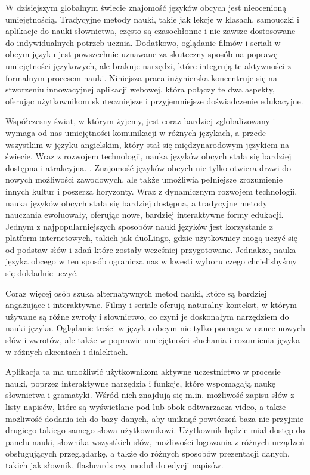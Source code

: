 W dzisiejszym globalnym świecie znajomość języków obcych jest nieocenioną umiejętnością. Tradycyjne metody nauki, takie jak lekcje w klasach, samouczki i aplikacje do nauki słownictwa, często są czasochłonne i nie zawsze dostosowane do indywidualnych potrzeb ucznia. Dodatkowo, oglądanie filmów i seriali w obcym języku jest powszechnie uznawane za skuteczny sposób na poprawę umiejętności językowych, ale brakuje narzędzi, które integrują te aktywności z formalnym procesem nauki. Niniejsza praca inżynierska koncentruje się na stworzeniu innowacyjnej aplikacji webowej, która połączy te dwa aspekty, oferując użytkownikom skuteczniejsze i przyjemniejsze doświadczenie edukacyjne.  

Współczesny świat, w którym żyjemy, jest coraz bardziej zglobalizowany i wymaga od nas umiejętności komunikacji w różnych językach, a przede wszystkim w języku angielskim, który stał się międzynarodowym językiem na świecie. Wraz z rozwojem technologii, nauka języków obcych stała się bardziej dostępna i atrakcyjna. . Znajomość języków obcych nie tylko otwiera drzwi do nowych możliwości zawodowych, ale także umożliwia pełniejsze zrozumienie innych kultur i poszerza horyzonty. Wraz z dynamicznym rozwojem technologii, nauka języków obcych stała się bardziej dostępna, a tradycyjne metody nauczania ewoluowały, oferując nowe, bardziej interaktywne formy edukacji. Jednym z najpopularniejszych sposobów nauki języków jest korzystanie z platform internetowych, takich jak duoLingo, gdzie użytkownicy mogą uczyć się od podstaw słów i zdań które zostały wcześniej przygotowane. Jednakże, nauka języka obcego w ten sposób ogranicza nas w kwesti wyboru czego chcielisbyśmy się dokładnie uczyć. 

Coraz więcej osób szuka alternatywnych metod nauki, które są bardziej angażujące i interaktywne. Filmy i seriale oferują naturalny kontekst, w którym używane są różne zwroty i słownictwo, co czyni je doskonałym narzędziem do nauki języka. Oglądanie treści w języku obcym nie tylko pomaga w nauce nowych słów i zwrotów, ale także w poprawie umiejętności słuchania i rozumienia języka w różnych akcentach i dialektach. 

Aplikacja ta ma umożliwić użytkownikom aktywne uczestnictwo w procesie nauki, poprzez interaktywne narzędzia i funkcje, które wspomagają naukę słownictwa i gramatyki. Wśród nich znajdują się m.in. możliwość zapisu słów z listy napisów, które są wyświetlane pod lub obok odtwarzacza video, a także możliwość dodania ich do bazy danych, aby uniknąć powtórzeń baza nie przyjmie drugiego takiego samego słowa użytkownikowi. Użytkownik będzie miał dostęp do panelu nauki, słownika wszystkich słów, możliwości logowania z różnych urządzeń obsługujących przeglądarkę, a także do różnych sposobów prezentacji danych, takich jak słownik, flashcards czy moduł do edycji napisów. 

